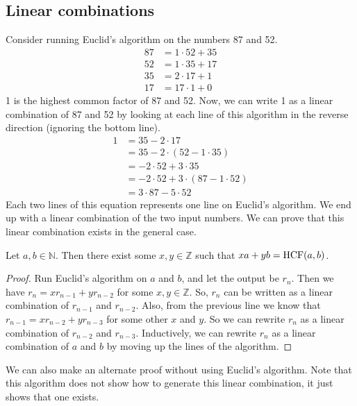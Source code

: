 \subsection{Linear combinations}
Consider running Euclid's algorithm on the numbers 87 and 52.
\begin{align*}
	87 & = 1 \cdot 52 + 35 \\
	52 & = 1 \cdot 35 + 17 \\
	35 & = 2 \cdot 17 + 1  \\
	17 & = 17 \cdot 1 + 0
\end{align*}
1 is the highest common factor of 87 and 52.
Now, we can write 1 as a linear combination of 87 and 52 by looking at each line of this algorithm in the reverse direction (ignoring the bottom line).
\begin{align*}
	1 & = 35 - 2 \cdot 17                         \\
	  & = 35 - 2 \cdot (52 - 1 \cdot 35)          \\
	  & = -2 \cdot 52 + 3 \cdot 35                \\
	  & = -2 \cdot 52 + 3 \cdot (87 - 1 \cdot 52) \\
	  & = 3 \cdot 87 - 5 \cdot 52
\end{align*}
Each two lines of this equation represents one line on Euclid's algorithm.
We end up with a linear combination of the two input numbers.
We can prove that this linear combination exists in the general case.
\begin{theorem}
	Let \(a, b \in \mathbb N\).
	Then there exist some \(x, y \in \mathbb Z\) such that \(xa + yb = \operatorname{HCF}(a, b)\).
\end{theorem}
\begin{proof}
	Run Euclid's algorithm on \(a\) and \(b\), and let the output be \(r_n\).
	Then we have \(r_n = x r_{n-1} + y r_{n-2}\) for some \(x, y \in \mathbb Z\).
	So, \(r_n\) can be written as a linear combination of \(r_{n-1}\) and \(r_{n-2}\).
	Also, from the previous line we know that \(r_{n-1} = x r_{n-2} + y r_{n-3}\) for some other \(x\) and \(y\).
	So we can rewrite \(r_{n}\) as a linear combination of \(r_{n-2}\) and \(r_{n-3}\).
	Inductively, we can rewrite \(r_n\) as a linear combination of \(a\) and \(b\) by moving up the lines of the algorithm.
\end{proof}
We can also make an alternate proof without using Euclid's algorithm.
Note that this algorithm does not show how to generate this linear combination, it just shows that one exists.
